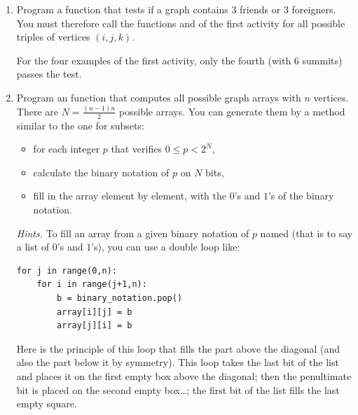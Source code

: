 \documentclass[11pt,class=report,crop=false]{standalone}
\begin{document}
\begin{activite}[Ramsey's theorem for $n=6$]


\begin{enumerate}
  \item Program a  function that tests if a graph contains $3$ friends or $3$ foreigners. You must therefore call the functions  and  of the first activity for all possible triples of vertices $(i,j,k)$.
 
 For the four examples of the first activity, only the fourth (with $6$ summits) passes the test.
  
  \item Program an  function that computes all possible graph arrays with $n$ vertices. There are $N = \frac{(n-1)n}{2}$ possible arrays. You can generate them by a method similar to the one for subsets:
  \begin{itemize}
    \item for each integer $p$ that verifies $0 \le p < 2^N$,
    \item calculate the binary notation of $p$ on $N$ bits,
    \item fill in the array element by element, with the $0$'s and $1$'s of the binary notation.
  \end{itemize}


\emph{Hints.}
To fill an array from a given binary notation of $p$ named  (that is to say a list of $0$'s and $1$'s), you can use a double loop like:

\begin{lstlisting}
for j in range(0,n):
    for i in range(j+1,n):
        b = binary_notation.pop()
        array[i][j] = b
        array[j][i] = b
\end{lstlisting}
  
Here is the principle of this loop that fills the part above the diagonal (and also the part below it by symmetry).
This loop takes the last bit of the list and places it on the first empty box above the diagonal; then the penultimate bit is placed on the second empty box\ldots; the first bit of the list fills the last empty square.


  

\end{enumerate}
\end{activite}
\end{document}
